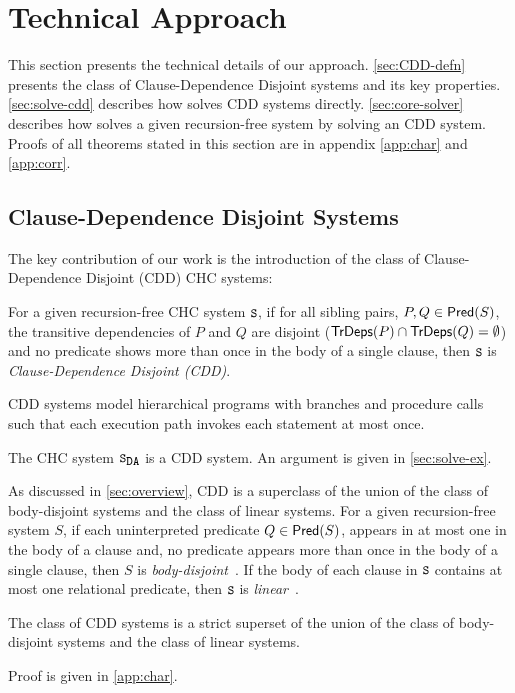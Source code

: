 \section{Technical Approach}
\label{sec:approach}
%
This section presents the technical details of our approach.
%
\autoref{sec:CDD-defn} presents the class of Clause-Dependence Disjoint
systems and its key properties.
%
\autoref{sec:solve-cdd} describes how \sys solves CDD systems
directly.
%
\autoref{sec:core-solver} describes how \sys solves a given
recursion-free system by solving an CDD system.
%
Proofs of all theorems stated in this section are in appendix
\autoref{app:char} and \autoref{app:corr}.

\subsection{Clause-Dependence Disjoint Systems}
\label{sec:CDD-defn}
%
The key contribution of our work is the introduction of the class of
Clause-Dependence Disjoint (CDD) CHC systems:
%
\begin{defn}
  \label{defn:cdds}
  For a given recursion-free CHC system $\cc{S}$,
  if for all sibling pairs, $P, Q \in \mathsf{Pred}( S )$,
  the transitive dependencies of $P$ and $Q$ are disjoint ($\mathsf{TrDeps}(P) \cap
  \mathsf{TrDeps}(Q) = \emptyset$)
  and no predicate shows more than once in the body of a single clause,
  then $\cc{S}$ is \emph{Clause-Dependence Disjoint (CDD)}.
\end{defn}
%
CDD systems model hierarchical programs with branches and procedure calls such
that each execution path invokes each statement at most once.
%
\begin{ex}
  The CHC system $\mcchc$ is a CDD system. An argument is given in
  \autoref{sec:solve-ex}.
\end{ex}

As discussed in \autoref{sec:overview}, CDD is a superclass of the union of
the class of body-disjoint systems and the class of linear systems.
%
For a given recursion-free system $S$, if each uninterpreted predicate $Q \in
\mathsf{Pred}( S )$, appears in at most one in the body of a clause and, no
predicate appears more than once in the body of a single clause,
then $S$ is \emph{body-disjoint}~\cite{rummer13a,rummer13b}.
%
If the body of each clause in $\cc{S}$ contains at most one relational
predicate, then $\cc{S}$ is \emph{linear}~\cite{albarghouthi12a}.

\begin{thm}
\label{thm:cdd-contains}
  The class of CDD systems is a strict superset of the union of the
  class of body-disjoint systems and the class of linear systems.
\end{thm}
%
Proof is given in \autoref{app:char}.

